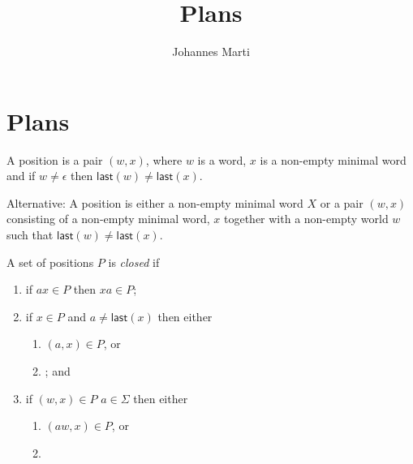 \documentclass[a4paper]{article}
\title{Plans}
\author{Johannes Marti}
\newcommand{\last}[1]{\mathsf{last}({#1})}
\begin{document}
\maketitle

\section{Plans}

A position is a pair $(w,x)$, where $w$ is a word, $x$ is a non-empty
minimal word and if $w \neq \epsilon$ then $\last{w} \neq \last{x}$.

Alternative:
A position is either a non-empty minimal word $X$ or a pair $(w,x)$ consisting
of a non-empty minimal word, $x$ together with a non-empty world $w$
such that $\last{w} \neq \last{x}$.

A set of positions $P$ is \emph{closed} if
\begin{enumerate}
 \item if $a x \in P$ then $x a \in P$;
 \item if $x \in P$ and $a \neq \last{x}$ then either
    \begin{enumerate}
     \item $(a,x) \in P$, or
     \item $ $; and
    \end{enumerate}
 \item if $(w, x) \in P$ $a \in \Sigma$ then either
    \begin{enumerate}
     \item $(aw, x) \in P$, or
     \item 
    \end{enumerate}

\end{enumerate}
\end{document}
